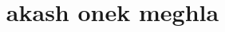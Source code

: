 \documentclass{beamer}
\begin{document}
\title{\Large{\textbf{akash onek meghla}}}
\maketitle
\end{document}
